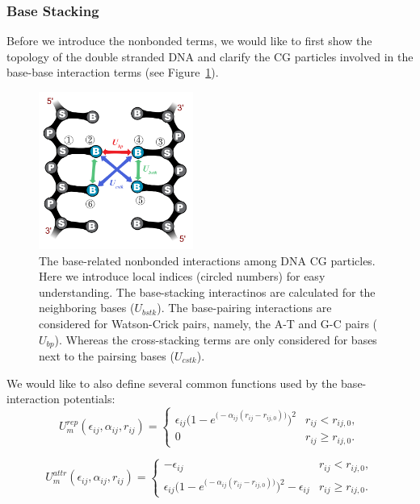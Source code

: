 \subsubsection{Base Stacking}
\label{sec:dna_3spn2c_potential_bstk}

Before we introduce the nonbonded terms, we would like to first show the
topology of the double stranded DNA and clarify the CG particles involved in the
base-base interaction terms (see Figure~\ref{fig:DNA_3spn2c_nonbonded_all}).

\begin{figure}[ht]
  \centering
  \includegraphics[width=0.45\textwidth]{figures/DNA_3spn2c_nonbonded_all.png}
  \caption{The base-related nonbonded interactions among DNA CG particles.  Here
    we introduce local indices (circled numbers) for easy understanding.  The
    base-stacking interactinos are calculated for the neighboring bases
    ($U_{bstk}$).  The base-pairing interactions are considered for Watson-Crick
    pairs, namely, the A-T and G-C pairs ($U_{bp}$).  Whereas the cross-stacking
    terms are only considered for bases next to the pairsing bases ($U_{cstk}$).}
  \label{fig:DNA_3spn2c_nonbonded_all}
\end{figure}

We would like to also define several common functions used by the
base-interaction potentials:
\begin{equation}
  \label{eq:dna_3spn2c_nonlocal_base_rep}
  U_m^{rep}(\epsilon_{ij}, \alpha_{ij}, r_{ij}) =
  \begin{cases}
    \epsilon_{ij} \Big( 1-e^{\big(-\alpha_{ij}(r_{ij}-r_{ij,0})\big)} \Big)^2 & r_{ij} < r_{ij, 0}, \\[.5em]
    0 & r_{ij} \ge r_{ij, 0}.
  \end{cases}
\end{equation}

\begin{equation}
  \label{eq:dna_3spn2c_nonlocal_base_attr}
  U_m^{attr}(\epsilon_{ij}, \alpha_{ij}, r_{ij}) =
  \begin{cases}
    -\epsilon_{ij} & r_{ij} < r_{ij, 0}, \\[.5em]
    \epsilon_{ij} \Big(1-e^{\big(-\alpha_{ij}(r_{ij}-r_{ij,0})\big)} \Big)^2 - \epsilon_{ij} & r_{ij} \ge r_{ij, 0}.
  \end{cases}
\end{equation}

